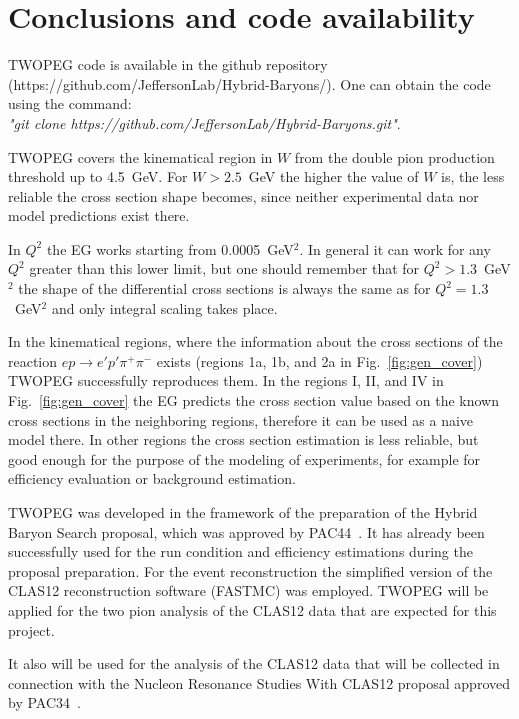 \chapter{Conclusions and code availability}
\label{sect:concl}


TWOPEG code is available in the github repository (https://github.com/JeffersonLab/Hybrid-Baryons/). 
One can obtain the code using the command: \\
 {\em "git clone  https://github.com/JeffersonLab/Hybrid-Baryons.git"}.

TWOPEG covers the kinematical region in $W$ from the double pion production threshold up to 4.5~GeV. For $W > 2.5$~GeV the higher the value of $W$ is, the less reliable the cross section shape becomes, since neither experimental data nor model predictions exist there.

In $Q^2$ the EG works starting from 0.0005~GeV$^2$. In general it can work for any $Q^2$ greater than this lower limit, but one should remember that for $Q^2 > 1.3$~GeV$^2$ the shape of the differential cross sections is always the same as for $Q^2 = 1.3$~GeV$^2$ and only integral scaling takes place. 



In the kinematical regions, where the information about the cross sections of the reaction $e p \rightarrow e' p' \pi^+ \pi^-$ exists (regions 1a, 1b, and 2a in Fig.~\ref{fig:gen_cover}) TWOPEG successfully reproduces them. In the regions I, II, and IV in Fig.~\ref{fig:gen_cover} the EG predicts the cross section value based on the known cross sections in the neighboring regions, therefore it can be used as a naive model there. In other regions the cross section estimation is less reliable, but good enough for the purpose of the modeling of experiments, for example for efficiency evaluation or background estimation.

TWOPEG was developed in the framework of the preparation of the Hybrid Baryon Search proposal, which was approved by PAC44~\cite{PAC44:Hybrid}.
It has already been successfully used for the run condition and efficiency estimations
during the proposal preparation.
For the event reconstruction the simplified version of the CLAS12 reconstruction software (FASTMC) was employed.
TWOPEG will be applied for the two pion analysis of the CLAS12 data that are expected for this project.  

It also will be used for the analysis of the CLAS12 data that will be collected in connection with the Nucleon Resonance Studies With CLAS12 proposal approved by PAC34~\cite{PAC34:twopi}.

